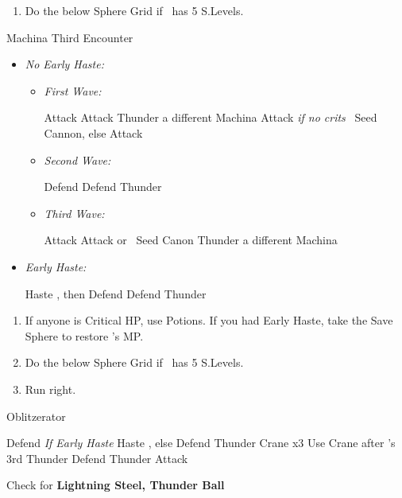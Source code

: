\begin{enumerate}[resume]
    \item Do the below Sphere Grid if \tidus\ has 5 S.Levels.
\end{enumerate}
\vfill
\begin{battle}{Machina Third Encounter}
    \begin{itemize}
        \item \textit{No Early Haste:}
        \begin{itemize}
            \item \textit{First Wave:}
            \begin{itemize}
                \tidusf Attack
                \kimahrif Attack
                \luluf Thunder a different Machina
                \tidusf Attack
                \kimahrif \textit{if no crits} \od\ Seed Cannon, else Attack
            \end{itemize}
            \item \textit{Second Wave:}
            \begin{itemize}
                \tidusf Defend
                \kimahrif Defend
                \luluf Thunder
            \end{itemize}
            \item \textit{Third Wave:}
            \begin{itemize}
                \tidusf Attack
                \kimahrif Attack or \od\ Seed Canon
                \luluf Thunder a different Machina
            \end{itemize}
        \end{itemize}
        \item \textit{Early Haste:}
        \begin{itemize}
            \tidusf Haste \lulu, then Defend
            \kimahrif Defend
            \luluf Thunder
        \end{itemize}
    \end{itemize}
\end{battle}
\begin{enumerate}[resume]
    \item If anyone is Critical HP, use Potions. If you had Early Haste, take the Save Sphere to restore \tidus's MP.
    \item Do the below Sphere Grid if \tidus\ has 5 S.Levels.
    \item Run right.
\end{enumerate}
\begin{battle}[3000]{Oblitzerator}
    \begin{itemize}
        \kimahrif Defend
        \tidusf \textit{If Early Haste} Haste \lulu, else Defend
        \luluf Thunder Crane x3
        \tidusf Use Crane after \lulu's 3rd Thunder
        \kimahrif Defend
        \luluf Thunder
        \tidusf Attack
    \end{itemize}
    Check for \textbf{Lightning Steel, Thunder Ball}
\end{battle}
